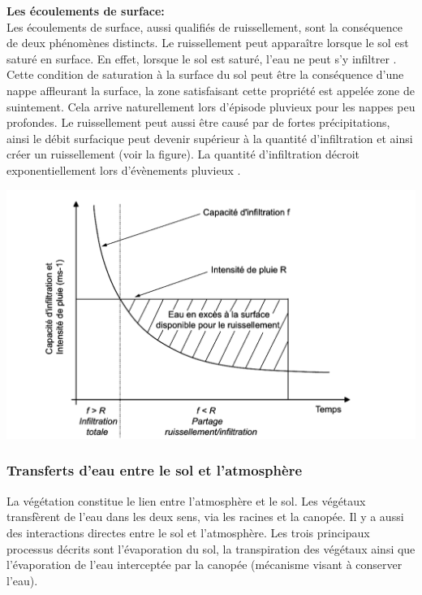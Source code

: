 \documentclass[a4paper,10pt]{article}
\begin{document}
	\textbf{Les écoulements de surface:}\\
	
	Les écoulements de surface, aussi qualifiés de ruissellement, sont la conséquence de deux phénomènes distincts. Le ruissellement peut apparaître lorsque le sol est saturé en surface. En effet, lorsque le sol est saturé, l’eau ne peut s’y infiltrer \cite{cappus1960etude}. Cette condition de saturation à la surface du sol peut être la conséquence d'une nappe affleurant la surface, la zone satisfaisant cette propriété est appelée zone de suintement. Cela arrive naturellement lors d'épisode pluvieux pour les nappes peu profondes. Le ruissellement peut aussi être causé par de fortes précipitations, ainsi le débit surfacique peut devenir supérieur à la quantité d'infiltration et ainsi créer un ruissellement (voir la figure). La quantité d'infiltration décroit exponentiellement lors d'évènements pluvieux \cite{horton1933role}.  
	
	\begin{center}
		\includegraphics[scale=0.2]{ruissellement.png}
	\end{center} 
	
	\subsubsection{Transferts d'eau entre le sol et l'atmosphère}
	
	La végétation constitue le lien entre l'atmosphère et le sol. Les végétaux transfèrent de l'eau dans les deux sens, via les racines et la canopée. Il y a aussi des interactions directes entre le sol et l'atmosphère. Les trois principaux processus décrits sont l'évaporation du sol, la transpiration des végétaux ainsi que l'évaporation de l'eau interceptée par la canopée (mécanisme visant à conserver l'eau).\\
	
\end{document}
